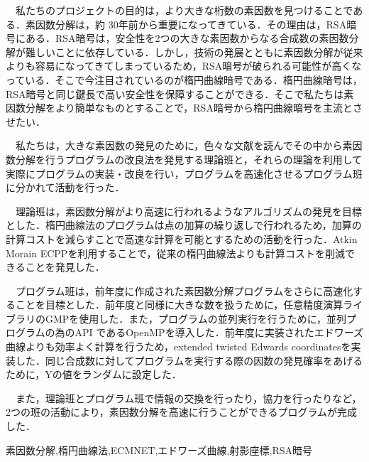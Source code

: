 \documentclass[openany,11pt,papersize]{jsbook}
\begin{document}
\begin{jabstract}
　私たちのプロジェクトの目的は，より大きな桁数の素因数を見つけることである．素因数分解は，約 30年前から重要になってきている．その理由は，RSA暗号にある．RSA暗号は，安全性を2つの大きな素因数からなる合成数の素因数分解が難しいことに依存している．しかし，技術の発展とともに素因数分解が従来よりも容易になってきてしまっているため，RSA暗号が破られる可能性が高くなっている．そこで今注目されているのが楕円曲線暗号である．楕円曲線暗号は，RSA暗号と同じ鍵長で高い安全性を保障することができる．そこで私たちは素因数分解をより簡単なものとすることで，RSA暗号から楕円曲線暗号を主流とさせたい．

　私たちは，大きな素因数の発見のために，色々な文献を読んでその中から素因数分解を行うプログラムの改良法を発見する理論班と，それらの理論を利用して実際にプログラムの実装・改良を行い，プログラムを高速化させるプログラム班に分かれて活動を行った．

　理論班は，素因数分解がより高速に行われるようなアルゴリズムの発見を目標とした．楕円曲線法のプログラムは点の加算の繰り返しで行われるため，加算の計算コストを減らすことで高速な計算を可能とするための活動を行った．Atkin Morain ECPPを利用することで，従来の楕円曲線法よりも計算コストを削減できることを発見した．

　プログラム班は，前年度に作成された素因数分解プログラムをさらに高速化することを目標とした．前年度と同様に大きな数を扱うために，任意精度演算ライブラリのGMPを使用した．また，プログラムの並列実行を行うために，並列プログラムの為のAPI であるOpenMPを導入した．前年度に実装されたエドワーズ曲線よりも効率よく計算を行うため，extended twisted Edwards coordinatesを実装した．同じ合成数に対してプログラムを実行する際の因数の発見確率をあげるために，Yの値をランダムに設定した．

　また，理論班とプログラム班で情報の交換を行ったり，協力を行ったりなど，2つの班の活動により，素因数分解を高速に行うことができるプログラムが完成した．


\begin{jkeyword}
素因数分解,楕円曲線法,ECMNET,エドワーズ曲線,射影座標,RSA暗号
\end{jkeyword}
\end{jabstract}

\end{document}
